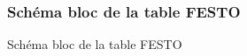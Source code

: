 \documentclass[10pt,a4paper,final]{article}
\begin{document}
\begin{spacing}{1.5}
\begin{figure}[hbtp]
\subsubsection{Schéma bloc de la table FESTO}
\caption{Schéma bloc de la table FESTO}
\centering
{}
\end{figure}

\vfill
\pagebreak


\begin{figure}[hbtp]

\end{figure}
\end{spacing}
\end{document}
